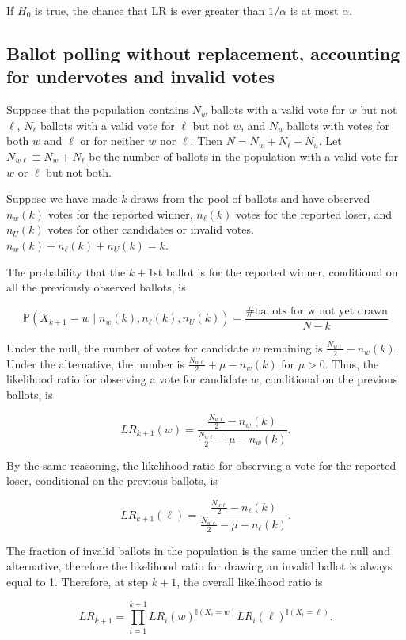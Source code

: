 \documentclass[12pt]{article}
\begin{document}
If $H_0$ is true, the chance that $\mbox{LR}$ is ever greater than $1/\alpha$
is at most $\alpha$.

\subsection{Ballot polling without replacement, accounting for undervotes and invalid votes}
\label{subsec:trinomial}
Suppose that the population contains $N_w$ ballots with a valid vote for $w$ but not $\ell$,
$N_\ell$ ballots with a valid vote for $\ell$ but not $w$, and $N_u$ ballots with votes for both
$w$ and $\ell$ or for neither $w$ nor $\ell$.
Then $N = N_w + N_\ell + N_u$.
Let $N_{w\ell} \equiv N_w + N_\ell$ be the number of ballots in the 
population with a valid vote for $w$ or $\ell$ but not both.

Suppose we have made $k$ draws from the pool of ballots and have observed $n_w(k)$ votes for the reported winner, 
$n_\ell(k)$ votes for the reported loser, 
and $n_U(k)$ votes for other candidates or invalid votes.
$n_w(k)+n_\ell(k)+n_U(k) = k$.

The probability that the $k+1$st ballot is for the reported winner, conditional on all the previously observed ballots, is

$$\mathbb{P}(X_{k+1} = w \mid  n_w(k), n_\ell(k), n_U(k)) = \frac{\text{\# ballots for w not yet drawn}}{N - k}$$

Under the null, the number of votes for candidate $w$ remaining is $\frac{N_{w\ell}}{2} - n_w(k)$.  
Under the alternative, the number is $\frac{N_{w\ell}}{2} + \mu - n_w(k)$ for $\mu > 0$.
Thus, the likelihood ratio for observing a vote for candidate $w$, conditional on the previous ballots, is

$$LR_{k+1}(w) = \frac{\frac{N_{w\ell}}{2} - n_w(k)}{\frac{N_{w\ell}}{2}+\mu - n_w(k)}.$$

By the same reasoning, the likelihood ratio for observing a vote for the reported loser, conditional on the previous ballots, is

$$LR_{k+1}(\ell) = \frac{\frac{N_{w\ell}}{2} - n_\ell(k)}{\frac{N_{w\ell}}{2}-\mu - n_\ell(k)}.$$

The fraction of invalid ballots in the population is the same under the null and alternative, therefore the likelihood ratio for drawing an invalid ballot is always equal to 1. Therefore, at step $k+1$, the overall likelihood ratio is

$$LR_{k+1} = \prod_{i=1}^{k+1} LR_i(w)^{\mathbb{I}(X_i= w)}LR_i(\ell)^{\mathbb{I}(X_i = \ell)}.$$
\end{document}
